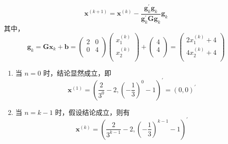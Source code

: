 \documentclass[cn,mtpro2,12pt]{elegantbook}
\begin{document}
\begin{solution}
    \begin{equation}
        \mathbf{x}^{(k+1)}=\mathbf{x}^{(k)}-\frac{\mathbf{g}_{k}^{\prime}\mathbf{g}_{k}}{\mathbf{g}_{k}^{\prime}\mathbf{G}\mathbf{g}_{k}}\mathbf{g}_{k}
    \end{equation}
    其中，
    \begin{equation}
        \mathbf{g}_{k}=\mathbf{G}\mathbf{x}_{k}+\mathbf{b}=\begin{pmatrix}2&0\\0&4\\\end{pmatrix}\begin{pmatrix}x^{(k)}_{1}\\x^{(k)}_{2}\\\end{pmatrix}+\begin{pmatrix}4\\4\\\end{pmatrix}=\begin{pmatrix}2x^{(k)}_{1}+4\\4x^{(k)}_{2}+4\\\end{pmatrix}
    \end{equation}

    \begin{enumerate}
        \item 当 $n=0$ 时，结论显然成立，即
              \begin{equation}
                  \mathbf{x}^{(1)}=\left(\frac{2}{3^{0}}-2,\left(-\frac{1}{3}\right)^{0}-1\right)^{\prime}=\left(0,0\right)^{\prime}
              \end{equation}

        \item 当 $n=k-1$ 时，假设结论成立，则有
              \begin{equation}
                  \mathbf{x}^{(k)}=\left(\frac{2}{3^{k-1}}-2,\left(-\frac{1}{3}\right)^{k-1}-1\right)^{\prime}
              \end{equation}


\end{enumerate}
\end{solution}
\end{document}
